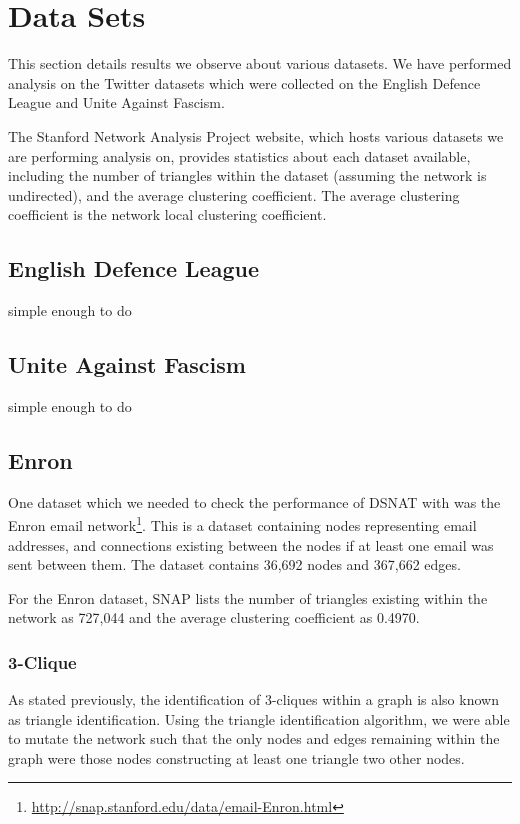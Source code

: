 \section{Data Sets}
\label{sec:results_datasets}
This section details results we observe about various datasets. We have performed analysis on the Twitter datasets which were collected on the English Defence League and Unite Against Fascism.

The Stanford Network Analysis Project website, which hosts various datasets we are performing analysis on, provides statistics about each dataset available, including the number of triangles within the dataset (assuming the network is undirected), and the average clustering coefficient. The average clustering coefficient is the network local clustering coefficient.

\subsection{English Defence League}
simple enough to do

\subsection{Unite Against Fascism}
simple enough to do

\subsection{Enron}
One dataset which we needed to check the performance of DSNAT with was the Enron email network\footnote{\url{http://snap.stanford.edu/data/email-Enron.html}}. This is a dataset containing nodes representing email addresses, and connections existing between the nodes if at least one email was sent between them. The dataset contains 36,692 nodes and 367,662 edges.

For the Enron dataset, SNAP lists the number of triangles existing within the network as 727,044 and the average clustering coefficient as 0.4970. 

\subsubsection{3-Clique}
As stated previously, the identification of 3-cliques within a graph is also known as triangle identification. Using the triangle identification algorithm, we were able to mutate the network such that the only nodes and edges remaining within the graph were those nodes constructing at least one triangle two other nodes.

